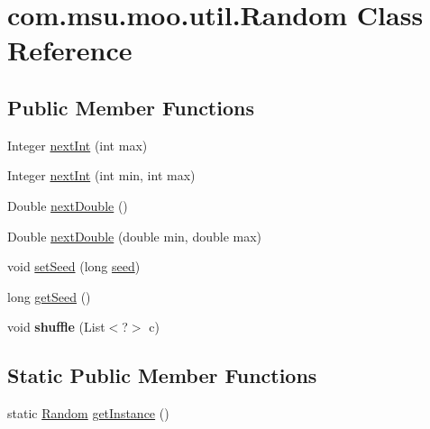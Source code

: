 \hypertarget{classcom_1_1msu_1_1moo_1_1util_1_1Random}{\section{com.\-msu.\-moo.\-util.\-Random Class Reference}
\label{classcom_1_1msu_1_1moo_1_1util_1_1Random}
}
\subsection*{Public Member Functions}
\begin{DoxyCompactItemize}
\item 
Integer \hyperlink{classcom_1_1msu_1_1moo_1_1util_1_1Random_af3b71ad155c4513eaaa8b1556767ff26}{next\-Int} (int max)
\item 
Integer \hyperlink{classcom_1_1msu_1_1moo_1_1util_1_1Random_ac9e121017e7630611ecfbc7e440cf7a9}{next\-Int} (int min, int max)
\item 
Double \hyperlink{classcom_1_1msu_1_1moo_1_1util_1_1Random_a32a22b76a2c1daad772e43957dd6dd7a}{next\-Double} ()
\item 
Double \hyperlink{classcom_1_1msu_1_1moo_1_1util_1_1Random_ab5d98f443d08e6809931e62a5fcf83ae}{next\-Double} (double min, double max)
\item 
void \hyperlink{classcom_1_1msu_1_1moo_1_1util_1_1Random_a73872b4d8d1973314c787070c813f33c}{set\-Seed} (long \hyperlink{classcom_1_1msu_1_1moo_1_1util_1_1Random_ae2ac6497beef04b12a28cb6e4706b57c}{seed})
\item 
long \hyperlink{classcom_1_1msu_1_1moo_1_1util_1_1Random_a632e2424c313b2c62019935834aa40e5}{get\-Seed} ()
\item 
\hypertarget{classcom_1_1msu_1_1moo_1_1util_1_1Random_a6ad21bc89260ca065844756e8af52904}{void {\bfseries shuffle} (List$<$?$>$ c)}\label{classcom_1_1msu_1_1moo_1_1util_1_1Random_a6ad21bc89260ca065844756e8af52904}

\end{DoxyCompactItemize}
\subsection*{Static Public Member Functions}
\begin{DoxyCompactItemize}
\item 
static \hyperlink{classcom_1_1msu_1_1moo_1_1util_1_1Random}{Random} \hyperlink{classcom_1_1msu_1_1moo_1_1util_1_1Random_aaa20005ec38b5944262c79c06d92ab62}{get\-Instance} ()
\end{DoxyCompactItemize}
